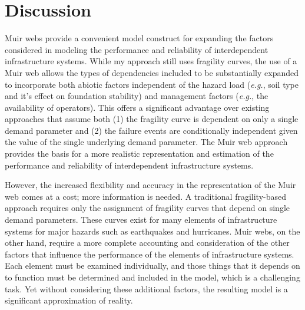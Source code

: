 \section{Discussion}
\label{sec:ch4:discussion}

Muir webs provide a convenient model construct for expanding the factors considered in modeling the performance and reliability of interdependent infrastructure systems. While my approach still uses fragility curves, the use of a Muir web allows the types of dependencies included to be substantially expanded to incorporate both abiotic factors independent of the hazard load (\emph{e.g.}, soil type and it’s effect on foundation stability) and management factors (\emph{e.g.}, the availability of operators). This offers a significant advantage over existing approaches that assume both (1) the fragility curve is dependent on only a single demand parameter and (2) the failure events are conditionally independent given the value of the single underlying demand parameter. The Muir web approach provides the basis for a more realistic representation and estimation of the performance and reliability of interdependent infrastructure systems.

However, the increased flexibility and accuracy in the representation of the Muir web comes at a cost; more information is needed. A traditional fragility-based approach requires only the assignment of fragility curves that depend on single demand parameters. These curves exist for many elements of infrastructure systems for major hazards such as earthquakes and hurricanes. Muir webs, on the other hand, require a more complete accounting and consideration of the other factors that influence the performance of the elements of infrastructure systems. Each element must be examined individually, and those things that it depends on to function must be determined and included in the model, which is a challenging task. Yet without considering these additional factors, the resulting model is a significant approximation of reality.

